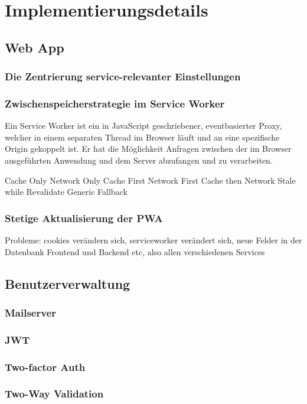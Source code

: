 \chapter{Implementierungsdetails}


\section{Web App}
\subsection{Die Zentrierung service-relevanter Einstellungen}

\subsection{Zwischenspeicherstrategie im Service Worker}
Ein Service Worker ist ein in JavaScript geschriebener,
eventbasierter Proxy, welcher in einem separaten Thread im Browser
läuft und an eine spezifische Origin gekoppelt ist. Er hat
die Möglichkeit Anfragen zwischen der im Browser ausgeführten
Anwendung und dem Server abzufangen und zu verarbeiten.

Cache Only
Network Only
Cache First
Network First
Cache then Network
Stale while Revalidate
Generic Fallback

\subsection{Stetige Aktualisierung der PWA}
Probleme: cookies verändern sich, serviceworker verändert sich, neue Felder in der Datenbank
Frontend und Backend etc, also allen verschiedenen Services

\section{Benutzerverwaltung}
\subsection{Mailserver}
\subsection{JWT}
\subsection{Two-factor Auth}
\subsection{Two-Way Validation}
